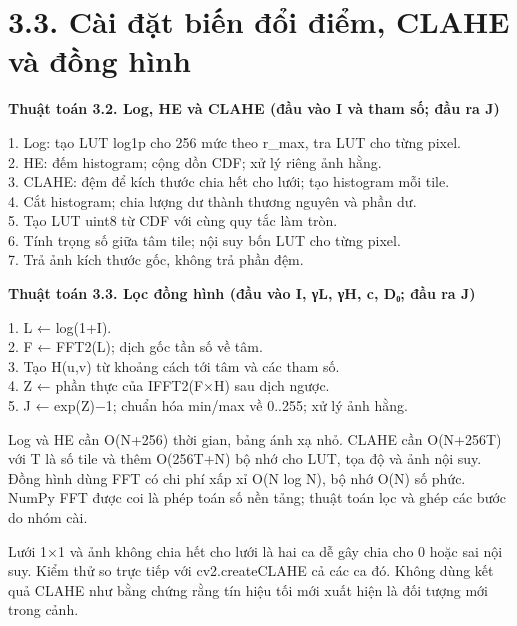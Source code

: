 \documentclass[13pt,a4paper]{extreport}
\begin{document}
\section*{3.3. Cài đặt biến đổi điểm, CLAHE và đồng hình}
\textbf{Thuật toán 3.2. Log, HE và CLAHE (đầu vào I và tham số; đầu ra J)}
\begin{flushleft}
1. Log: tạo LUT log1p cho 256 mức theo r\_max, tra LUT cho từng pixel.\\
2. HE: đếm histogram; cộng dồn CDF; xử lý riêng ảnh hằng.\\
3. CLAHE: đệm để kích thước chia hết cho lưới; tạo histogram mỗi tile.\\
4. Cắt histogram; chia lượng dư thành thương nguyên và phần dư.\\
5. Tạo LUT uint8 từ CDF với cùng quy tắc làm tròn.\\
6. Tính trọng số giữa tâm tile; nội suy bốn LUT cho từng pixel.\\
7. Trả ảnh kích thước gốc, không trả phần đệm.\\
\end{flushleft}
\textbf{Thuật toán 3.3. Lọc đồng hình (đầu vào I, γL, γH, c, D₀; đầu ra J)}
\begin{flushleft}
1. L ← log(1+I).\\
2. F ← FFT2(L); dịch gốc tần số về tâm.\\
3. Tạo H(u,v) từ khoảng cách tới tâm và các tham số.\\
4. Z ← phần thực của IFFT2(F×H) sau dịch ngược.\\
5. J ← exp(Z)−1; chuẩn hóa min/max về 0..255; xử lý ảnh hằng.\\
\end{flushleft}
Log và HE cần O(N+256) thời gian, bảng ánh xạ nhỏ. CLAHE cần O(N+256T) với T là số tile và thêm O(256T+N) bộ nhớ cho LUT, tọa độ và ảnh nội suy. Đồng hình dùng FFT có chi phí xấp xỉ O(N log N), bộ nhớ O(N) số phức. NumPy FFT được coi là phép toán số nền tảng; thuật toán lọc và ghép các bước do nhóm cài.
\par
Lưới 1×1 và ảnh không chia hết cho lưới là hai ca dễ gây chia cho 0 hoặc sai nội suy. Kiểm thử so trực tiếp với cv2.createCLAHE cả các ca đó. Không dùng kết quả CLAHE như bằng chứng rằng tín hiệu tối mới xuất hiện là đối tượng mới trong cảnh.
\par
\clearpage
\end{document}

